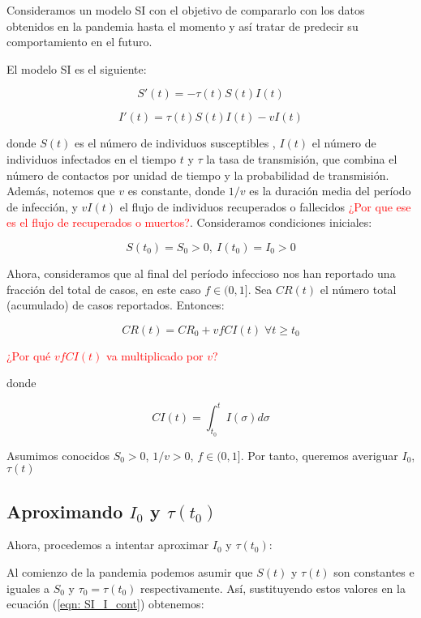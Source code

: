Consideramos un modelo SI con el objetivo de compararlo con los datos obtenidos en la pandemia hasta el momento y así tratar de predecir su comportamiento en el futuro.

El modelo SI es el siguiente:

\begin{equation}
\label{eqn: SI_S_cont}
S'(t) = -\tau (t)S(t)I(t)
\end{equation}

\begin{equation}
\label{eqn: SI_I_cont}
I'(t) = \tau (t)S(t)I(t) -vI(t)
\end{equation}

donde $S(t)$ es el número de individuos susceptibles , $I(t)$ el número de individuos infectados en el tiempo $t$ y $\tau$ la tasa de transmisión, que combina el número de contactos por unidad de tiempo y la probabilidad de transmisión. Además, notemos que $v$ es constante, donde $1/v$ es la duración media del período de infección, y $vI(t)$ el flujo de individuos recuperados o fallecidos \textcolor{red}{¿Por que ese es el flujo de recuperados o muertos?}. Consideramos condiciones iniciales:

$$S(t_0)=S_0>0, \: I(t_0)=I_0>0$$

Ahora, consideramos que al final del período infeccioso nos han reportado una fracción del total de casos, en este caso $f\in (0,1]$. Sea $CR(t)$ el número total (acumulado) de casos reportados. Entonces:

\begin{equation}
\label{eqn: acumulada}
CR(t) = CR_0 + vfCI(t) \; \forall t \geq t_0
\end{equation}

\textcolor{red}{¿Por qué $vfCI(t)$ va multiplicado por $v$?}

donde

$$CI(t) = \int_{t_0}^t I(\sigma ) d\sigma $$

Asumimos conocidos $S_0 > 0$, $1/v>0$, $f\in (0,1]$. Por tanto, queremos averiguar $I_0$, $\tau (t)$

\subsection{Aproximando $I_0$ y $\tau (t_0)$}
Ahora, procedemos a intentar aproximar $I_0$ y $\tau (t_0)$:

Al comienzo de la pandemia podemos asumir que $S(t)$ y $\tau (t)$ son constantes e iguales a $S_0$ y $\tau_0 = \tau (t_0)$ respectivamente. Así, sustituyendo estos valores en la ecuación (\ref{eqn: SI_I_cont}) obtenemos:

